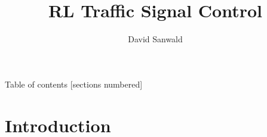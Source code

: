 \documentclass[10pt]{beamer}
\title{RL Traffic Signal Control}
\author{David Sanwald}
\begin{document}
\maketitle

\begin{frame}{Table of contents}
  [sections numbered]
  \tableofcontents[hideallsubsections]
\end{frame}

\section{Introduction}





\end{document}
